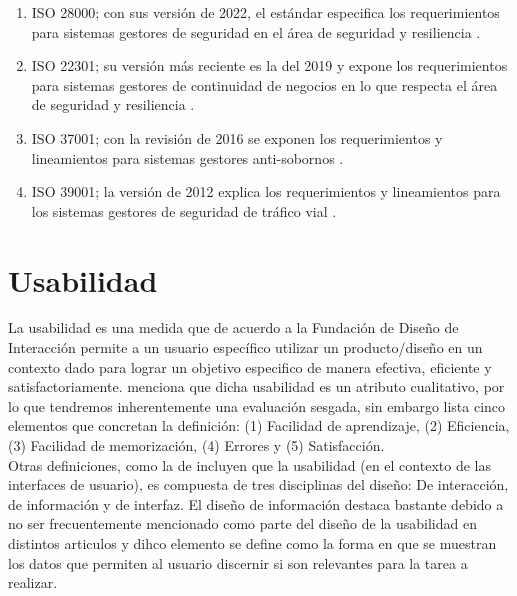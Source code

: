 \begin{enumerate}
    \item ISO 28000; con sus versión de 2022, el estándar especifica los requerimientos para sistemas gestores de seguridad en el área de seguridad y resiliencia \cite{international-organization-for-standardization-2022A}. %
    \item ISO 22301; su versión más reciente es la del 2019 y expone los requerimientos para sistemas gestores de continuidad de negocios en lo que respecta el área de seguridad y resiliencia \cite{international-standard-for-organization-2020}. %
    \item ISO 37001; con la revisión de 2016 se exponen los requerimientos y lineamientos para sistemas gestores anti-sobornos \cite{international-organization-for-standardization-2021E}. %
    \item ISO 39001; la versión de 2012 explica los requerimientos y lineamientos para los sistemas gestores de seguridad de tráfico vial \cite{international-organization-for-standardizartion-2013}. %
\end{enumerate}

\section{Usabilidad}
La usabilidad es una medida que de acuerdo a la Fundación de Diseño de Interacción \cite{unknown-authorunknown-author-2023} %
permite a un usuario específico utilizar un producto/diseño en un contexto dado para lograr
un objetivo especifico de manera efectiva, eficiente y satisfactoriamente. \cite{unknown-author-no-dateB} menciona %
que dicha usabilidad es un atributo cualitativo, por lo que tendremos inherentemente una
evaluación sesgada, sin embargo lista cinco elementos que concretan la definición:
(1) Facilidad de aprendizaje, (2) Eficiencia, (3) Facilidad de memorización, (4) Errores 
y (5) Satisfacción.
\\

Otras definiciones, como la de \cite{guntupalli-no-date} %
incluyen que la usabilidad (en el contexto de las interfaces de usuario),
es compuesta de tres disciplinas del diseño: De interacción, de información y de 
interfaz. El diseño de información destaca bastante debido a no ser frecuentemente mencionado como 
parte del diseño de la usabilidad en distintos articulos y dihco elemento se define como la forma en 
que se muestran los datos que permiten al usuario discernir si son relevantes para la tarea a realizar.
\\

